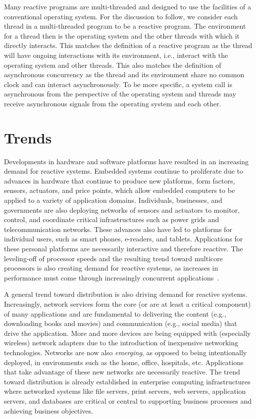 Many reactive programs are multi-threaded and designed to use the facilities of a conventional operating system.
For the discussion to follow, we consider each thread in a multi-threaded program to be a reactive program.
The environment for a thread then is the operating system and the other threads with which it directly interacts.
This matches the definition of a reactive program as the thread will have ongoing interactions with its environment, i.e., interact with the operating system and other threads.
This also matches the definition of asynchronous concurrency as the thread and its environment share no common clock and can interact asynchronously.
To be more specific, a system call is asynchronous from the perspective of the operating system and threads may receive asynchronous signals from the operating system and each other.

\section{Trends}

Developments in hardware and software platforms have resulted in an increasing demand for reactive systems.
Embedded systems continue to proliferate due to advances in hardware that continue to produce new platforms, form factors, sensors, actuators, and price points, which allow embedded computers to be applied to a variety of application domains.
Individuals, businesses, and governments are also deploying networks of sensors and actuators to monitor, control, and coordinate critical infrastructures such as power grids and telecommunication networks.
These advances also have led to platforms for individual users, such as smart phones, e-readers, and tablets.
Applications for these personal platforms are necessarily interactive and therefore reactive.
The leveling-off of processor speeds and the resulting trend toward multicore processors is also creating demand for reactive systems, as increases in performance must come through increasingly concurrent applications~\cite{sutter2005software}.

A general trend toward distribution is also driving demand for reactive systems.
Increasingly, network services form the core (or are at least a critical component) of many applications and are fundamental to delivering the content (e.g., downloading books and movies) and communication (e.g., social media) that drive the application.
More and more devices are being equipped with (especially wireless) network adapters due to the introduction of inexpensive networking technologies.
Networks are now also \emph{emerging}, as opposed to being intentionally deployed, in environments such as the home, office, hospitals, etc.
Applications that take advantage of these new networks are necessarily reactive.
The trend toward distribution is already established in enterprise computing infrastructures where networked systems like file servers, print servers, web servers, application servers, and databases are critical or central to supporting business processes and achieving business objectives.

